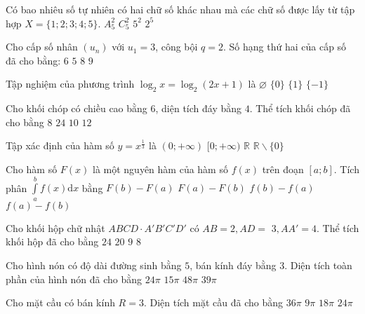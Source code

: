 \begin{ex}%
Có bao nhiêu số tự nhiên có hai chữ số khác nhau mà các chữ số được lấy từ tập hợp $X=\{1; 2; 3; 4; 5\}$.
\choice
{\True $A_5^2$}
{$C_5^2$}
{$5^2$}
{$2^5$}

\end{ex}
\begin{ex}%
Cho cấp số nhân $\left(u_n\right)$ với $u_1=3$, công bội $q=2$. Số hạng thứ hai của cấp số đã cho bằng:
\choice
{\True $6$}
{$5$}
{$8$}
{$9$}

\end{ex}
\begin{ex}%
Tập nghiệm của phương trình $\log_2 x=\log_2(2 x+1)$ là
\choice
{\True $\varnothing$}
{$\{0\}$}
{$\{1\}$}
{$\{-1\}$}

\end{ex}
\begin{ex}%
Cho khối chóp có chiều cao bằng $6$, diện tích đáy bằng $4$. Thể tích khối chóp đã cho bằng
\choice
{\True $8$}
{$24$}
{$10$}
{$12$}

\end{ex}
\begin{ex}%
Tập xác định của hàm số $y=x^{\frac{1}{3}}$ là
\choice
{\True $(0;+\infty)$}
{$[0;+\infty)$}
{$\mathbb{R}$}
{$\mathbb{R} \backslash\{0\}$}

\end{ex}
\begin{ex}%
Cho hàm số $F(x)$ là một nguyên hàm của hàm số $f(x)$ trên đoạn $[a; b]$. Tích phân $\displaystyle\int\limits_a^{b} f(x) \mathrm{d} x$ bằng
\choice
{\True $F(b)-F(a)$}
{$F(a)-F(b)$}
{$f(b)-f(a)$}
{$f(a)-f(b)$}

\end{ex}
\begin{ex}%
Cho khối hộp chữ nhật $ABCD \cdot A'B'C'D'$ có $AB=2, AD=$ $3, AA'=4$. Thể tích khối hộp đã cho bằng
\choice
{\True $24$}
{$20$}
{$9$}
{$8$}

\end{ex}
\begin{ex}%
Cho hình nón có độ dài đường sinh bằng $5$, bán kính đáy bằng $3$. Diện tích toàn phần của hình nón đã cho bằng
\choice
{\True $24\pi$}
{$15\pi$}
{$48\pi$}
{$39\pi$}

\end{ex}
\begin{ex}%
Cho mặt cầu có bán kính $R=3$. Diện tích mặt cầu đã cho bằng
\choice
{\True $36\pi$}
{$9\pi$}
{$18\pi$}
{$24\pi$}

\end{ex}
